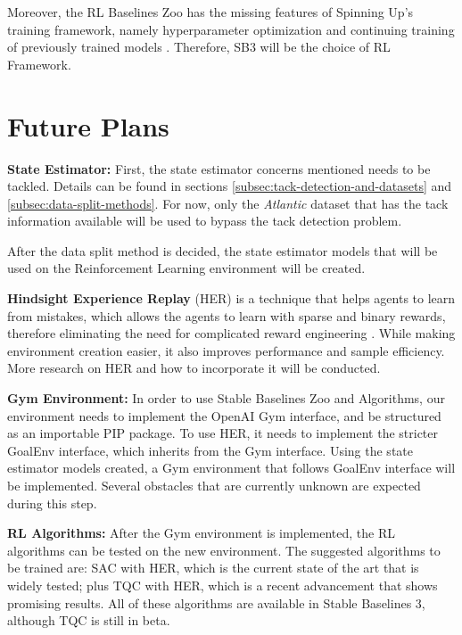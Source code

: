 Moreover, the RL Baselines Zoo has the missing features of Spinning Up's training framework, namely hyperparameter optimization and continuing training of previously trained models \cite{rl-zoo3}. Therefore, SB3 will be the choice of RL Framework.

\section{Future Plans}

\qquad\textbf{State Estimator:} 
First, the state estimator concerns mentioned needs to be tackled. Details can be found in sections \ref{subsec:tack-detection-and-datasets} and \ref{subsec:data-split-methods}. For now, only the \emph{Atlantic} dataset that has the tack information available will be used to bypass the tack detection problem.

After the data split method is decided, the state estimator models that will be used on the Reinforcement Learning environment will be created.

\textbf{Hindsight Experience Replay}
(HER) is a technique that helps agents to learn from mistakes, which allows the agents to learn with sparse and binary rewards, therefore eliminating the need for complicated reward engineering \cite{her-paper}. While making environment creation easier, it also improves performance and sample efficiency. More research on HER and how to incorporate it will be conducted.

\textbf{Gym Environment:}
In order to use Stable Baselines Zoo and Algorithms, our environment needs to implement the OpenAI Gym interface, and be structured as an importable PIP package. To use HER, it needs to implement the stricter GoalEnv interface, which inherits from the Gym interface. Using the state estimator models created, a Gym environment that follows GoalEnv interface will be implemented. Several obstacles that are currently unknown are expected during this step.

\textbf{RL Algorithms:}
After the Gym environment is implemented, the RL algorithms can be tested on the new environment. The suggested algorithms to be trained are: SAC with HER, which is the current state of the art that is widely tested; plus TQC with HER, which is a recent advancement that shows promising results. All of these algorithms are available in Stable Baselines 3, although TQC is still in beta.

